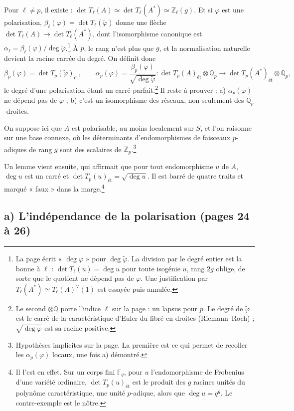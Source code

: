 \documentclass[11pt,a4paper]{article}
\begin{document}
Pour $\ell \neq p$, il existe : $\det T_\ell(A) \simeq \det T_\ell(A^*) \simeq
\mathbb{Z}_\ell(g)$. Et si $\varphi$ est une polarisation, $\beta_\ell(\varphi)
= \det T_\ell(\tilde\varphi)$ donne une flèche $\det T_\ell(A) \to \det
T_\ell(A^*)$, dont l'isomorphisme canonique est $\alpha_\ell =
\beta_\ell(\varphi)/\deg\tilde\varphi$.\footnote{La page écrit « $\deg
\varphi$ » pour $\deg\tilde\varphi$. La division par le degré entier est la
bonne à $\ell$ : $\det T_\ell(u) = \deg u$ pour toute isogénie $u$, rang $2g$
oblige, de sorte que le quotient ne dépend pas de $\varphi$. Une
justification par $T_\ell(A^*) \simeq T_\ell(A)^\vee(1)$ est essayée puis
annulée.} À $p$, le rang n'est plus que $g$, et la normalisation naturelle
devient la racine carrée du degré. On définit donc
\[
\beta_p(\varphi) = \det T_p(\tilde\varphi)_{\text{ét}} , \qquad
\alpha_p(\varphi) = \frac{\beta_p(\varphi)}{\sqrt{\deg\tilde\varphi}} :
\det T_p(A)_{\text{ét}} \otimes \mathbb{Q}_p \to \det T_p(A^*)_{\text{ét}}
\otimes \mathbb{Q}_p ,
\]
le degré d'une polarisation étant un carré parfait.\footnote{Le second
$\otimes\mathbb{Q}$ porte l'indice $\ell$ sur la page : un lapsus pour $p$.
Le degré de $\tilde\varphi$ est le carré de la caractéristique d'Euler du
fibré en droites (Riemann--Roch) ; $\sqrt{\deg\tilde\varphi}$ est sa racine
positive.} Il reste à prouver : a) $\alpha_p(\varphi)$ ne dépend pas de
$\varphi$ ; b) c'est un isomorphisme des réseaux, non seulement des
$\mathbb{Q}_p$-droites.

On suppose ici que $A$ est polarisable, au moins localement sur $S$, et l'on
raisonne sur une base connexe, où les déterminants d'endomorphismes de
faisceaux $p$-adiques de rang $g$ sont des scalaires de $\mathbb{Z}_p$.\footnote{Hypothèses
implicites sur la page. La première est ce qui permet de recoller les
$\alpha_p(\varphi)$ locaux, une fois a) démontré.}

Un lemme vient ensuite, qui affirmait que pour tout endomorphisme $u$ de $A$,
$\deg u$ est un carré et $\det T_p(u)_{\text{ét}} = \sqrt{\deg u}$. Il est
barré de quatre traits et marqué « faux » dans la marge.\footnote{Il l'est en
effet. Sur un corps fini $\mathbb{F}_q$, pour $u$ l'endomorphisme de Frobenius
d'une variété ordinaire, $\det T_p(u)_{\text{ét}}$ est le produit des $g$
racines unités du polynôme caractéristique, une unité $p$-adique, alors que
$\deg u = q^g$. Le contre-exemple est le nôtre.}

\subsection*{a) L'indépendance de la polarisation (pages 24 à 26)}
\end{document}
